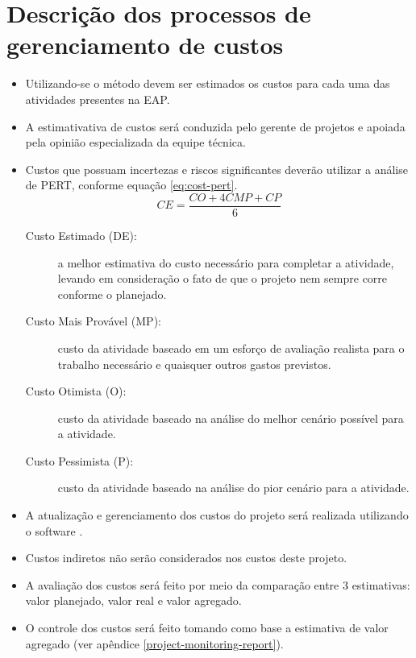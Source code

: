 \section{Descrição dos processos de gerenciamento de custos}


\begin{itemize}
	\item Utilizando-se o método  devem ser estimados os custos para cada uma das atividades presentes na EAP.
	\item A estimativativa de custos será conduzida pelo gerente de projetos e apoiada pela opinião especializada da equipe técnica.
	\item Custos que possuam incertezas e riscos significantes deverão utilizar a análise de PERT, conforme equação \ref{eq:cost-pert}.
	      \begin{equation}\label{eq:cost-pert}
		      CE = \frac{CO+4CMP+CP}{6}
	      \end{equation}
	      \begin{description}
		      \item[Custo Estimado (DE):] a melhor estimativa do custo necessário para completar a atividade, levando em consideração o fato de que o projeto nem sempre corre conforme o planejado.
		      \item[Custo Mais Provável (MP):] custo da atividade baseado em um esforço de avaliação realista para o trabalho necessário e quaisquer outros gastos previstos.
		      \item[Custo Otimista (O):] custo da atividade baseado na análise do melhor cenário possível para a atividade.
		      \item[Custo Pessimista (P):] custo da atividade baseado na análise do pior cenário para a atividade.
	      \end{description}
	\item A atualização e gerenciamento dos custos do projeto será realizada utilizando o software \projectManagementSoftwareName{}.
	\item Custos indiretos não serão considerados nos custos deste projeto.
	\item A avaliação dos custos será feito por meio da comparação entre 3 estimativas: valor planejado, valor real e valor agregado.
	\item O controle dos custos será feito tomando como base a estimativa de valor agregado (ver apêndice \ref{project-monitoring-report}).
\end{itemize}

